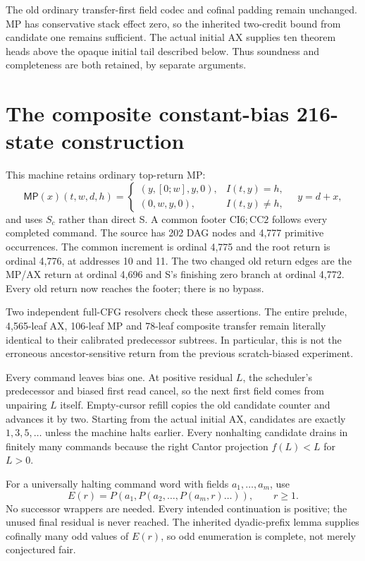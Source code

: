 \documentclass[11pt]{article}
\newcommand{\MP}{\mathsf{MP}}
\begin{document}
The old ordinary transfer-first field codec and cofinal padding remain unchanged. MP has conservative stack effect zero, so the inherited two-credit bound from candidate one remains sufficient. The actual initial AX supplies ten theorem heads above the opaque initial tail described below. Thus soundness and completeness are both retained, by separate arguments.

\section{The composite constant-bias 216-state construction}
This machine retains ordinary top-return MP:
\[
 \MP(x)(t,w,d,h)=
 \begin{cases}(y,[0;w],y,0),&I(t,y)=h,\\(0,w,y,0),&I(t,y)\ne h,\end{cases}\quad y=d+x,
\]
and uses $S_c$ rather than direct S. A common footer $\mathrm{CI}6;\mathrm{CC}2$ follows every completed command. The source has 202 DAG nodes and 4,777 primitive occurrences. The common increment is ordinal 4,775 and the root return is ordinal 4,776, at addresses 10 and 11. The two changed old return edges are the MP/AX return at ordinal 4,696 and S's finishing zero branch at ordinal 4,772. Every old return now reaches the footer; there is no bypass.

Two independent full-CFG resolvers check these assertions. The entire prelude, 4,565-leaf AX, 106-leaf MP and 78-leaf composite transfer remain literally identical to their calibrated predecessor subtrees. In particular, this is not the erroneous ancestor-sensitive return from the previous scratch-biased experiment.

Every command leaves bias one. At positive residual $L$, the scheduler's predecessor and biased first read cancel, so the next first field comes from unpairing $L$ itself. Empty-cursor refill copies the old candidate counter and advances it by two. Starting from the actual initial AX, candidates are exactly $1,3,5,\ldots$ unless the machine halts earlier. Every nonhalting candidate drains in finitely many commands because the right Cantor projection $f(L)<L$ for $L>0$.

For a universally halting command word with fields $a_1,\ldots,a_m$, use
\[
 E(r)=P(a_1,P(a_2,\ldots,P(a_m,r)\ldots)),\qquad r\ge1.
\]
No successor wrappers are needed. Every intended continuation is positive; the unused final residual is never reached. The inherited dyadic-prefix lemma supplies cofinally many odd values of $E(r)$, so odd enumeration is complete, not merely conjectured fair.
\end{document}

